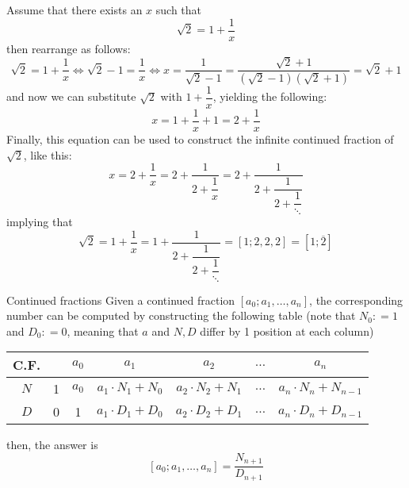 \documentclass[a4paper, 12pt]{report}
\begin{document}
    \begin{example}
        Assume that there exists an $x$ such that $$\sqrt 2 = 1 + \dfrac{1}{x}$$ then rearrange as follows: $$\sqrt 2 = 1 + \dfrac{1}{x} \iff \sqrt 2 - 1 = \dfrac{1}{x} \iff x = \dfrac{1}{\sqrt 2 - 1} = \dfrac{\sqrt 2 + 1}{(\sqrt 2 - 1)(\sqrt 2+ 1)} = \sqrt 2 + 1$$ and now we can substitute $\sqrt 2$ with $1 + \dfrac{1}{x}$, yielding the following: $$x = 1 + \dfrac{1}{x} + 1 = 2 + \dfrac{1}{x}$$ Finally, this equation can be used to construct the infinite continued fraction of $\sqrt 2$, like this: $$x = 2 + \dfrac{1}{x} = 2 + \dfrac{1}{2 + \dfrac{1}{x}} = 2 + \dfrac{1}{2 + \dfrac{1}{2 + \dfrac{1}{\ddots}}}$$ implying that $$\sqrt 2 = 1 + \dfrac{1}{x} = 1 + \dfrac{1}{2 + \dfrac{1}{2 + \dfrac{1}{\ddots}}} = [1; 2, 2, 2] = [1; \overline 2]$$
    \end{example}

    \begin{framedalgo}[label={cont frac alg}]{Continued fractions}
        Given a continued fraction $[a_0; a_1, \ldots, a_n]$, the corresponding number can be computed by constructing the following table (note that $N_0: = 1$ and $D_0: = 0$, meaning that $a$ and $N, D$ differ by 1 position at each column)

        \begin{center}
            \begin{tabular}{c|c|c|c|c|c|c} 
                C.F. & & $a_0$ & $a_1$ & $a_2$ & $\ldots$ & $a_n$ \\
                \hline
                $N$ & 1 & $a_0$ & $a_1 \cdot N_1 + N_0$ & $a_2 \cdot N_2 + N_1$ & $\ldots$ & $a_n \cdot N_n + N_{n - 1}$ \\
                \hline
                $D$ & 0 & 1 & $a_1 \cdot D_1 + D_0$ & $a_2 \cdot D_2 + D_1$ & $\ldots$ & $a_n \cdot D_n + D_{n - 1}$ \\
                \hline
            \end{tabular}
        \end{center}

        then, the answer is $$[a_0; a_1, \ldots, a_n] = \dfrac{N_{n + 1}}{D_{n + 1}}$$
    \end{framedalgo}

\end{document}
